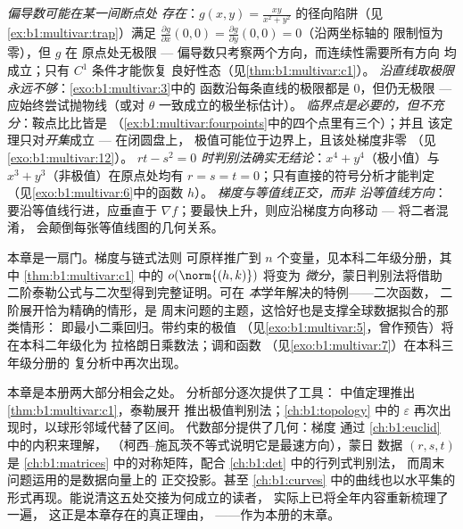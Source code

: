 \begin{remark}[常见陷阱]
\label{rem:b1:multivar:pitfalls}
\emph{偏导数可能在某一间断点处
存在}：$g(x,y) = \frac{xy}{x^2+y^2}$ 的径向陷阱（见
\cref{ex:b1:multivar:trap}）满足 $\frac{\partial g}{\partial
x}(0,0) = \frac{\partial g}{\partial y}(0,0) = 0$（沿两坐标轴的
限制恒为零），但 $g$ 在
原点处无极限 --- 偏导数只考察两个方向，而连续性需要所有方向
均成立；只有 $C^1$ 条件才能恢复
良好性态（见\cref{thm:b1:multivar:c1}）。
\emph{沿直线取极限永远不够}：\cref{exo:b1:multivar:3}中的
函数沿每条直线的极限都是 $0$，但仍无极限 ---
应始终尝试抛物线（或对
$\theta$ 一致成立的极坐标估计）。
\emph{临界点是必要的，但不充分}：鞍点比比皆是
（\cref{ex:b1:multivar:fourpoints}中的四个点里有三个）；并且
该定理只对\emph{开集}成立 --- 在闭圆盘上，
极值可能位于边界上，且该处梯度非零
（见\cref{exo:b1:multivar:12}）。
\emph{$rt - s^2 = 0$ 时判别法确实无结论}：$x^4
+ y^4$（极小值）与 $x^3 + y^3$（非极值）在原点处均有 $r = s = t
= 0$；只有直接的符号分析才能判定
（见\cref{exo:b1:multivar:6}中的函数 $h$）。
\emph{梯度与等值线正交，而非
沿等值线方向}：要沿等值线行进，应垂直于 $\nabla
f$；要最快上升，则应沿梯度方向移动 --- 将二者混淆，
会颠倒每张等值线图的几何关系。
\end{remark}

\begin{remark}[双变量的去向]
\label{rem:b1:multivar:whereused}
本章是一扇门。梯度与链式法则
可原样推广到 $n$ 个变量，见本科二年级分册，其中
\cref{thm:b1:multivar:c1} 中的 $o(\norm{(h,k)})$ 将变为
\emph{微分}，蒙日判别法将借助
二阶泰勒公式与二次型得到完整证明。可在
\emph{本}学年解决的特例——二次函数，
二阶展开恰为精确的情形，是
周末问题的主题，这恰好也是支撑全球数据拟合的那类情形：
即最小二乘回归。带约束的极值
（见\cref{exo:b1:multivar:5}，曾作预告）将在本科二年级化为
拉格朗日乘数法；调和函数
（见\cref{exo:b1:multivar:7}）在本科三年级分册的
复分析中再次出现。
\end{remark}

\begin{remark}
\label{rem:b1:multivar:perspectives}
本章是本册两大部分相会之处。
分析部分逐次提供了工具：
中值定理推出 \cref{thm:b1:multivar:c1}，泰勒展开
推出极值判别法；\cref{ch:b1:topology} 中的 $\varepsilon$
再次出现时，以球形邻域代替了区间。
代数部分提供了几何：梯度
通过 \cref{ch:b1:euclid} 中的内积来理解，
（柯西–施瓦茨不等式说明它是最速方向），蒙日
数据 $(r, s, t)$ 是
\cref{ch:b1:matrices} 中的对称矩阵，配合 \cref{ch:b1:det} 中的行列式判别法，
而周末问题运用的是数据向量上的
正交投影。甚至
\cref{ch:b1:curves} 中的曲线也以水平集的形式再现。能说清这五处交接为何成立的读者，
实际上已将全年内容重新梳理了一遍，
这正是本章存在的真正理由，
——作为本册的末章。
\end{remark}

